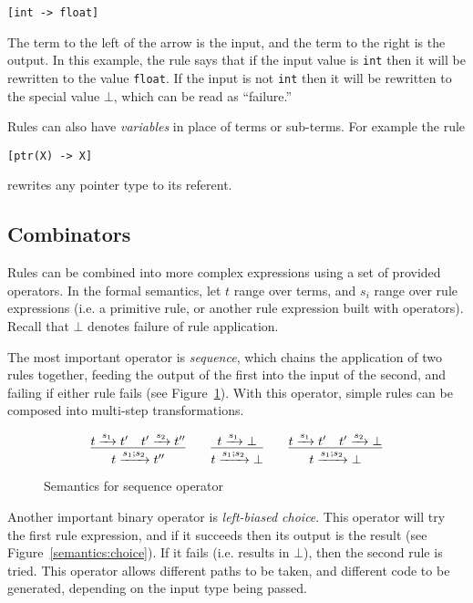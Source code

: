 \begin{verbatim}
[int -> float]
\end{verbatim}

The term to the left of the arrow is the input, and the term to the right is
the output. In this example, the rule says that if the input value is
\texttt{int} then it will be rewritten to the value \texttt{float}. If the
input is not \texttt{int} then it will be rewritten to the special value
$\bot$, which can be read as ``failure.''

Rules can also have \emph{variables} in place of terms or sub-terms. For
example the rule

\begin{verbatim}
[ptr(X) -> X]
\end{verbatim}

rewrites any pointer type to its referent.

\subsection{Combinators}

Rules can be combined into more complex expressions using a set of provided
operators. In the formal semantics, let $t$ range over terms, and $s_i$ range
over rule expressions (i.e. a primitive rule, or another rule expression built
with operators). Recall that $\bot$ denotes failure of rule application.

The most important operator is \emph{sequence}, which chains the application
of two rules together, feeding the output of the first into the input of the
second, and failing if either rule fails (see
Figure~\ref{semantics:sequence}). With this operator, simple rules can be
composed into multi-step transformations.

\begin{figure}[h]
\label{semantics:sequence}
\[
\infer{t \arr{s_1;s_2} t''}{t \arr{s_1} t' \quad t' \arr{s_2} t''}
\qquad 
\infer{t \arr{s_1;s_2} \bot}{t \arr{s_1} \bot}
\qquad
\infer{t \arr{s_1;s_2} \bot}{t \arr{s_1} t' \quad t' \arr{s_2} \bot}
\]
\caption{Semantics for sequence operator}
\end{figure}

Another important binary operator is \emph{left-biased choice}. This operator
will try the first rule expression, and if it succeeds then its output is the
result (see Figure~\ref{semantics:choice}). If it fails (i.e. results in
$\bot$), then the second rule is tried. This operator allows different paths
to be taken, and different code to be generated, depending on the input type
being passed.

